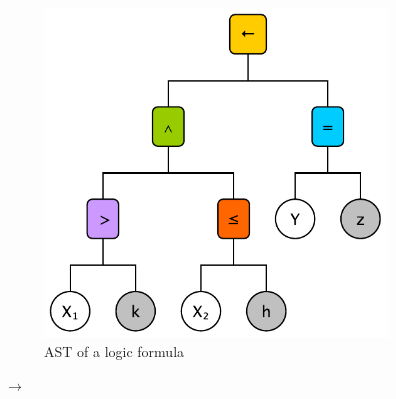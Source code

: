 
\begin{figure}
    \centering
    \caption{
        Example of the encoding process of logic formulas into real-values functions.
        Only \gls{AST} are depicted. Box coloured in the same way represent the encoding of a given operator through each encoding step.
        So, for instance, operator $<$ (red) is firstly converted into a negated $\geq$, and then in a combination of $max$ and subtractions.
    }
    \begin{subfigure}[]{0.3\linewidth}
        \centering
        \includegraphics[scale=\astscale]{figures/ast-unencoded}
        \caption{AST of a logic formula}
        \label{fig:ast-unencoded}
    \end{subfigure}
    $\rightarrow$
    \begin{subfigure}[]{0.3\linewidth}
        \centering

\end{subfigure}
\end{figure}
